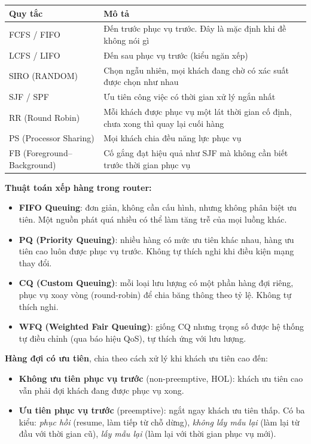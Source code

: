 \begin{center}
\begin{tabularx}{\linewidth}{@{}l X@{}}
\toprule
\textbf{Quy tắc} & \textbf{Mô tả} \\
\midrule
FCFS / FIFO & Đến trước phục vụ trước. Đây là mặc định khi đề không nói gì \\
LCFS / LIFO & Đến sau phục vụ trước (kiểu ngăn xếp) \\
SIRO (RANDOM) & Chọn ngẫu nhiên, mọi khách đang chờ có xác suất được chọn như nhau \\
SJF / SPF & Ưu tiên công việc có thời gian xử lý ngắn nhất \\
RR (Round Robin) & Mỗi khách được phục vụ một lát thời gian cố định, chưa xong thì quay lại cuối hàng \\
PS (Processor Sharing) & Mọi khách chia đều năng lực phục vụ \\
FB (Foreground--Background) & Cố gắng đạt hiệu quả như SJF mà không cần biết trước thời gian phục vụ \\
\bottomrule
\end{tabularx}
\end{center}

\textbf{Thuật toán xếp hàng trong router:}
\begin{itemize}
  \item \textbf{FIFO Queuing}: đơn giản, không cần cấu hình, nhưng không phân biệt ưu tiên. Một nguồn phát quá nhiều có thể làm tăng trễ của mọi luồng khác.
  \item \textbf{PQ (Priority Queuing)}: nhiều hàng có mức ưu tiên khác nhau, hàng ưu tiên cao luôn được phục vụ trước. Không tự thích nghi khi điều kiện mạng thay đổi.
  \item \textbf{CQ (Custom Queuing)}: mỗi loại lưu lượng có một phần hàng đợi riêng, phục vụ xoay vòng (round-robin) để chia băng thông theo tỷ lệ. Không tự thích nghi.
  \item \textbf{WFQ (Weighted Fair Queuing)}: giống CQ nhưng trọng số được hệ thống tự điều chỉnh (qua báo hiệu QoS), tự thích ứng với lưu lượng.
\end{itemize}

\textbf{Hàng đợi có ưu tiên}, chia theo cách xử lý khi khách ưu tiên cao đến:
\begin{itemize}
  \item \textbf{Không ưu tiên phục vụ trước} (non-preemptive, HOL): khách ưu tiên cao vẫn phải đợi khách đang được phục vụ xong.
  \item \textbf{Ưu tiên phục vụ trước} (preemptive): ngắt ngay khách ưu tiên thấp. Có ba kiểu: \emph{phục hồi} (resume, làm tiếp từ chỗ dừng), \emph{không lấy mẫu lại} (làm lại từ đầu với thời gian cũ), \emph{lấy mẫu lại} (làm lại với thời gian phục vụ mới).
\end{itemize}
